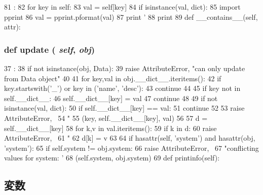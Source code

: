 \begin{DoxyCode}
81                           :
82         for key in self:
83             val = self[key]
84             if isinstance(val, dict):
85                 import pprint
86                 val = pprint.pformat(val)
87             print '%
88         print
89 
    def __contains__(self, attr):
\end{DoxyCode}
\hypertarget{classm5_1_1util_1_1jobfile_1_1Data_abe52b977c101e59f342489ed18140819}{
\subsubsection[{update}]{\setlength{\rightskip}{0pt plus 5cm}def update ( {\em self}, \/   {\em obj})}}
\label{classm5_1_1util_1_1jobfile_1_1Data_abe52b977c101e59f342489ed18140819}



\begin{DoxyCode}
37                          :
38         if not isinstance(obj, Data):
39             raise AttributeError, "can only update from Data object"
40 
41         for key,val in obj.__dict__.iteritems():
42             if key.startswith('_') or key in ('name', 'desc'):
43                 continue
44 
45             if key not in self.__dict__:
46                 self.__dict__[key] = val
47                 continue
48 
49             if not isinstance(val, dict):
50                 if self.__dict__[key] == val:
51                     continue
52 
53                 raise AttributeError, \
54                       "%
55                       (key, self.__dict__[key], val)
56 
57             d = self.__dict__[key]
58             for k,v in val.iteritems():
59                 if k in d:
60                     raise AttributeError, \
61                           "%
62                 d[k] = v
63 
64         if hasattr(self, 'system') and hasattr(obj, 'system'):
65             if self.system != obj.system:
66                 raise AttributeError, \
67                       "conflicting values for system: '%
68                       (self.system, obj.system)
69 
    def printinfo(self):
\end{DoxyCode}


\subsection{変数}
\hypertarget{classm5_1_1util_1_1jobfile_1_1Data_aafc566bb08a9f46485e7238669581c2b}{
\subsubsection[{desc}]{\setlength{\rightskip}{0pt plus 5cm}{\bf desc}}}
\label{classm5_1_1util_1_1jobfile_1_1Data_aafc566bb08a9f46485e7238669581c2b}


